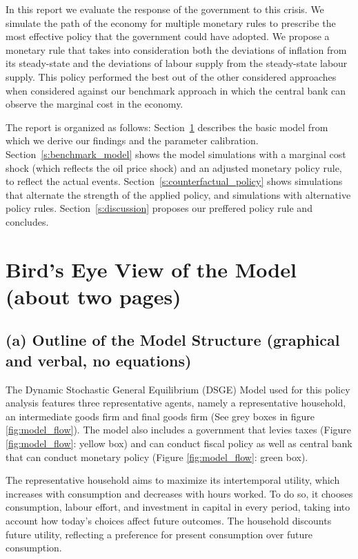 \documentclass[12pt]{article}
\begin{document}
In this report we evaluate the response of the government to this crisis. We simulate the path of the economy for multiple monetary rules to prescribe the most effective policy that the government could have adopted. We propose a monetary rule that takes into consideration both the deviations of inflation from its steady-state and the deviations of labour supply from the steady-state labour supply. This policy performed the best out of the other considered approaches when considered against our benchmark approach in which the central bank can observe the marginal cost in the economy.

The report is organized as follows: Section~\ref{s:model_description} describes the basic model from which we derive our findings and the parameter calibration. Section~\ref{s:benchmark_model} shows the model simulations with a marginal cost shock (which reflects the oil price shock) and an adjusted monetary policy rule, to reflect the actual events. Section~\ref{s:counterfactual_policy} shows simulations that alternate the strength of the applied policy, and simulations with alternative policy rules. Section~\ref{s:discussion} proposes our preffered policy rule and concludes. 

\newpage
\section{Bird’s Eye View of the Model (about two pages)}\label{s:model_description}


\subsection*{(a) Outline of the Model Structure (graphical and verbal, no equations)}
The Dynamic Stochastic General Equilibrium (DSGE) Model used for this policy analysis features
three representative agents, namely a representative household, an intermediate goods firm and final goods firm (See grey boxes in figure \ref{fig:model_flow}). The model also includes a government that levies taxes (Figure \ref{fig:model_flow}: yellow box) and can conduct fiscal policy as well as central bank that can conduct monetary policy (Figure \ref{fig:model_flow}: green box).

The representative household aims to maximize its intertemporal utility, which increases with consumption and decreases with hours worked. To do so, it chooses consumption, labour effort, and investment in capital in every period, taking into account how today's choices affect future outcomes. The household discounts future utility, reflecting a preference for present consumption over future consumption.
\end{document}
